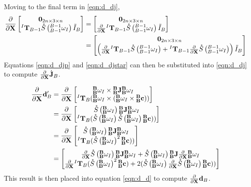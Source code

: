 Moving to the final term in \ref{eqn:d_dj},
\begin{align}
    \partialX{}\begin{bmatrix} 
	\ZERO_{2n \times 3 \times n} \\
	{{^I{\T}_{B-1}}\S{^{B-1}_{B-1}\omega_I}\ITilde_B} \\
	\end{bmatrix}  &= \begin{bmatrix} 
	\ZERO_{2n \times 3 \times n} \\
	\partialX{}{{^I{\T}_{B-1}}\S{^{B-1}_{B-1}\omega_I}\ITilde_B} \\
	\end{bmatrix} \nonumber\\ \label{eqn:d_djstar}
	&= \begin{bmatrix} 
	\ZERO_{2n \times 3 \times n} \\
	\left ( \partialX{}{^I{\T}_{B-1}}\S{^{B-1}_{B-1}\omega_I} + {^I{\T}_{B-1}}\partialX{}\S{^{B-1}_{B-1}\omega_I} \right ) \ITilde_B \\
	\end{bmatrix} 
\end{align}
\noindent Equations \ref{eqn:d_djp} and \ref{eqn:d_djstar} can then be substituted into  \ref{eqn:d_dj} to compute $\partialX{}\dotJ_B$. 

\begin{align} \nonumber
    \partialX{}\d_B' &= \partialX{}\begin{bmatrix}                            
	{\BB\omega_I } \times {\BB\J} {\BB\omega_I} \\
	{^I\T_B}  (\BB\omega_I \times (\BB\omega_I \times {\BB\com}))\\
	\end{bmatrix} \\ \nonumber
	 &= \partialX{}\begin{bmatrix}                            
	\S{\BB\omega_I } {\BB\J} {\BB\omega_I} \\
	{^I\T_B}  (\S{\BB\omega_I}\S{\BB\omega_I} {\BB\com}))\\
	\end{bmatrix} \\ \nonumber
	&= \partialX{}\begin{bmatrix}                            
	\S{\BB\omega_I } {\BB\J} {\BB\omega_I} \\
	{^I\T_B}  (\S{\BB\omega_I}^2 {\BB\com}))\\ 
	\end{bmatrix} \\ \nonumber
	&= \begin{bmatrix}                            
	\partialX{}\S{\BB\omega_I } {\BB\J} {\BB\omega_I} + \S{\BB\omega_I }{\BB\J}\partialX{}{\BB\omega_I} \\
	\partialX{}{^I\T_B}(\S{\BB\omega_I}^2 {\BB\com}) + 2(\S{\BB\omega_I}\partialX{}\S{\BB\omega_I} {\BB\com}))\\
	\end{bmatrix}
\end{align}
This result is then placed into equation \ref{eqn:d_d} to compute $ \partialX{}\d_B$.

